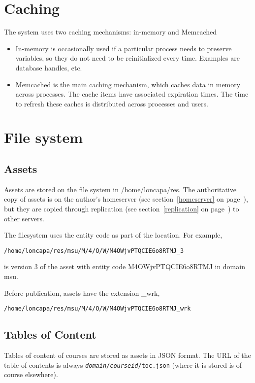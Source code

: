 \section{Caching}
The system uses two caching mechanisms: in-memory and Memcached
\begin{itemize}
\item In-memory is occasionally used if a particular process needs to preserve variables, so they do not need to be reinitialized every time. Examples are database handles, etc.
\item Memcached is the main caching mechanism, which caches data in memory across processes. The cache items have associated expiration times. The time to refresh these caches is distributed across processes and users.
\end{itemize}
\section{File system}\label{resfilesystem}
\subsection{Assets}
Assets are stored on the file system in /home/loncapa/res. The authoritative copy of assets is on the author's homeserver (see section~\ref{homeserver} on page~\pageref{homeserver}), but they are copied through replication (see section~\ref{replication} on page~\pageref{replication}) to other servers.

The filesystem uses the entity code as part of the location. For example,
\begin{verbatim}
/home/loncapa/res/msu/M/4/O/W/M4OWjvPTQCIE6o8RTMJ_3
\end{verbatim}
is version 3 of the asset with entity code M4OWjvPTQCIE6o8RTMJ in domain msu.

Before publication, assets have the extension \_wrk,
\begin{verbatim}
/home/loncapa/res/msu/M/4/O/W/M4OWjvPTQCIE6o8RTMJ_wrk
\end{verbatim}
\subsection{Tables of Content}
Tables of content of courses are stored as assets in JSON format. The URL of the table of contents is always {\tt {\it domain}/{\it courseid}/toc.json} (where it is stored is of course elsewhere).

